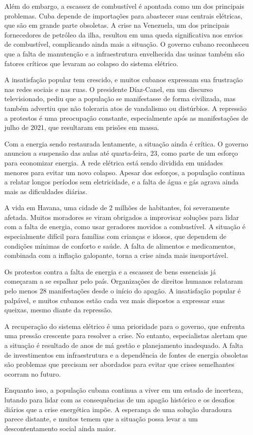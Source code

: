 \documentclass{minimal} %
\begin{document}
{Além do embargo, a escassez de combustível é apontada como um dos principais problemas. Cuba depende de importações para abastecer suas centrais elétricas, que são em grande parte obsoletas. A crise na Venezuela, um dos principais fornecedores de petróleo da ilha, resultou em uma queda significativa nos envios de combustível, complicando ainda mais a situação. O governo cubano reconheceu que a falta de manutenção e a infraestrutura envelhecida das usinas também são fatores críticos que levaram ao colapso do sistema elétrico.

A insatisfação popular tem crescido, e muitos cubanos expressam sua frustração nas redes sociais e nas ruas. O presidente Díaz-Canel, em um discurso televisionado, pediu que a população se manifestasse de forma civilizada, mas também advertiu que não toleraria atos de vandalismo ou distúrbios. A repressão a protestos é uma preocupação constante, especialmente após as manifestações de julho de 2021, que resultaram em prisões em massa.

Com a energia sendo restaurada lentamente, a situação ainda é crítica. O governo anunciou a suspensão das aulas até quarta-feira, 23, como parte de um esforço para economizar energia. A rede elétrica está sendo dividida em unidades menores para evitar um novo colapso. Apesar dos esforços, a população continua a relatar longos períodos sem eletricidade, e a falta de água e gás agrava ainda mais as dificuldades diárias.

A vida em Havana, uma cidade de 2 milhões de habitantes, foi severamente afetada. Muitos moradores se viram obrigados a improvisar soluções para lidar com a falta de energia, como usar geradores movidos a combustível. A situação é especialmente difícil para famílias com crianças e idosos, que dependem de condições mínimas de conforto e saúde. A falta de alimentos e medicamentos, combinada com a inflação galopante, torna a crise ainda mais insuportável.

Os protestos contra a falta de energia e a escassez de bens essenciais já começaram a se espalhar pelo país. Organizações de direitos humanos relataram pelo menos 28 manifestações desde o início do apagão. A insatisfação popular é palpável, e muitos cubanos estão cada vez mais dispostos a expressar suas queixas, mesmo diante da repressão.

A recuperação do sistema elétrico é uma prioridade para o governo, que enfrenta uma pressão crescente para resolver a crise. No entanto, especialistas alertam que a situação é resultado de anos de má gestão e planejamento inadequado. A falta de investimentos em infraestrutura e a dependência de fontes de energia obsoletas são problemas que precisam ser abordados para evitar que crises semelhantes ocorram no futuro.

Enquanto isso, a população cubana continua a viver em um estado de incerteza, lutando para lidar com as consequências de um apagão histórico e os desafios diários que a crise energética impõe. A esperança de uma solução duradoura parece distante, e muitos temem que a situação possa levar a um descontentamento social ainda maior.}
\end{document}
